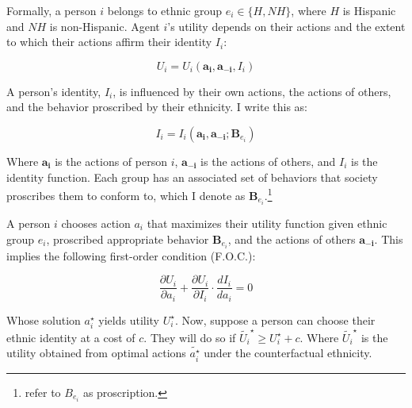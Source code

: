 \documentclass[12pt, fullpage]{article}
\begin{document}
Formally, a person $i$ belongs to ethnic group $e_i \in \{H, NH\}$, where $H$ is Hispanic and $NH$ is non-Hispanic. Agent $ i$'s utility depends on their actions and the extent to which their actions affirm their identity $I_i$:

\begin{equation}
U_i = U_i(\pmb{a_i}, \pmb{a_{-i}}, I_i)\label{eq:util}
\end{equation}

A person's identity, $I_i$, is influenced by their own actions, the actions of others, and the behavior proscribed by their ethnicity. I write this as:

\begin{equation}
I_i = I_i(\pmb{a_i}, \pmb{a_{-i}}; \pmb{B}_{e_{i}})\label{eq:identity}
\end{equation}

Where $\pmb{a_i}$ is the actions of person $i$, $\pmb{a_{-i}}$ is the actions of others, and $I_i$ is the identity function. Each group has an associated set of behaviors that society proscribes them to conform to, which I denote as $\pmb{B}_{e_{i}}$.\footnote{\citet{akerlofEconomicsIdentity2000} refer to $B_{e_{i}}$ as proscription.}

A person $i$ chooses action $a_i$ that maximizes their utility function given ethnic group $e_i$, proscribed appropriate behavior $\pmb{B}_{e_{i}}$, and the actions of others $\pmb{a_{-i}}$. This implies the following first-order condition (F.O.C.):

\begin{equation}
\frac{\partial U_i}{\partial a_i} + \frac{\partial U_i}{\partial I_i} \cdot \frac{d I_i}{d a_i} = 0\label{eq:foc}
\end{equation}

Whose solution $a_{i}^{\star}$ yields utility $U_{i}^{\star}$. Now, suppose a person can choose their ethnic identity at a cost of $c$. They will do so if $\tilde{U_{i}}^{\star} \geq  U_{i}^{\star} + c$. Where $\tilde{U_{i}}^{\star}$ is the utility obtained from optimal actions $\tilde{a_i^{\star}}$ under the counterfactual ethnicity. 
\end{document}
